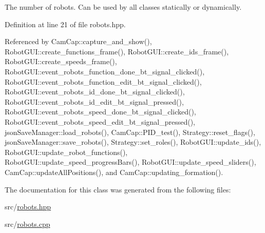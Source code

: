 The number of robots. Can be used by all classes statically or dynamically. 



Definition at line 21 of file robots.\+hpp.



Referenced by Cam\+Cap\+::capture\+\_\+and\+\_\+show(), Robot\+G\+U\+I\+::create\+\_\+functions\+\_\+frame(), Robot\+G\+U\+I\+::create\+\_\+ids\+\_\+frame(), Robot\+G\+U\+I\+::create\+\_\+speeds\+\_\+frame(), Robot\+G\+U\+I\+::event\+\_\+robots\+\_\+function\+\_\+done\+\_\+bt\+\_\+signal\+\_\+clicked(), Robot\+G\+U\+I\+::event\+\_\+robots\+\_\+function\+\_\+edit\+\_\+bt\+\_\+signal\+\_\+clicked(), Robot\+G\+U\+I\+::event\+\_\+robots\+\_\+id\+\_\+done\+\_\+bt\+\_\+signal\+\_\+clicked(), Robot\+G\+U\+I\+::event\+\_\+robots\+\_\+id\+\_\+edit\+\_\+bt\+\_\+signal\+\_\+pressed(), Robot\+G\+U\+I\+::event\+\_\+robots\+\_\+speed\+\_\+done\+\_\+bt\+\_\+signal\+\_\+clicked(), Robot\+G\+U\+I\+::event\+\_\+robots\+\_\+speed\+\_\+edit\+\_\+bt\+\_\+signal\+\_\+pressed(), json\+Save\+Manager\+::load\+\_\+robots(), Cam\+Cap\+::\+P\+I\+D\+\_\+test(), Strategy\+::reset\+\_\+flags(), json\+Save\+Manager\+::save\+\_\+robots(), Strategy\+::set\+\_\+roles(), Robot\+G\+U\+I\+::update\+\_\+ids(), Robot\+G\+U\+I\+::update\+\_\+robot\+\_\+functions(), Robot\+G\+U\+I\+::update\+\_\+speed\+\_\+progress\+Bars(), Robot\+G\+U\+I\+::update\+\_\+speed\+\_\+sliders(), Cam\+Cap\+::update\+All\+Positions(), and Cam\+Cap\+::updating\+\_\+formation().



The documentation for this class was generated from the following files\+:\begin{DoxyCompactItemize}
\item 
src/\hyperlink{robots_8hpp}{robots.\+hpp}\item 
src/\hyperlink{robots_8cpp}{robots.\+cpp}\end{DoxyCompactItemize}
